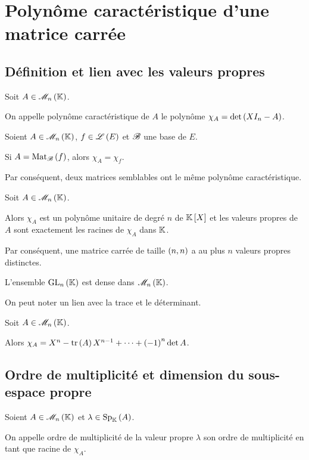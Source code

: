 \section{Polynôme caractéristique d'une matrice carrée}

\subsection{Définition et lien avec les valeurs propres}

\begin{defi}
Soit \(A\in\M{n}\).

On appelle polynôme caractéristique de \(A\) le polynôme \(\chi_A=\det\left(XI_n-A\right)\).
\end{defi}

\begin{prop}
Soient \(A\in\M{n}\), \(f\in\mathscr{L}\left(E\right)\) et \(\mathscr{B}\) une base de \(E\).

Si \(A=\Mat{f}\), alors \(\chi_A=\chi_f\).
\end{prop}

Par conséquent, deux matrices semblables ont le même polynôme caractéristique.

\begin{theo}
Soit \(A\in\M{n}\).

Alors \(\chi_A\) est un polynôme unitaire de degré \(n\) de \(\poly\) et les valeurs propres de \(A\) sont exactement les racines de \(\chi_A\) dans \(\mathbb{K}\).

Par conséquent, une matrice carrée de taille \(\left(n,n\right)\) a au plus \(n\) valeurs propres distinctes.
\end{theo}

\begin{cor}
L'ensemble \(\GL{n}\) est dense dans \(\M{n}\).
\end{cor}

On peut noter un lien avec la trace et le déterminant.

\begin{prop}
Soit \(A\in\M{n}\).

Alors \(\chi_A=X^n-\operatorname{tr}\left(A\right)X^{n-1}+\dots+\left(-1\right)^n\det A\).
\end{prop}

\subsection{Ordre de multiplicité et dimension du sous-espace propre}

\begin{defi}
Soient \(A\in\M{n}\) et \(\lambda\in\Sp[\K]{A}\).

On appelle ordre de multiplicité de la valeur propre \(\lambda\) son ordre de multiplicité en tant que racine de \(\chi_A\).
\end{defi}

